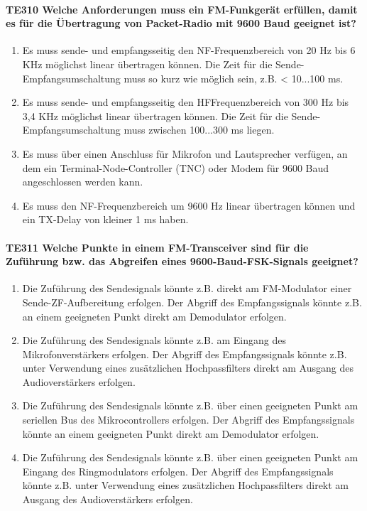 \documentclass[8pt]{article}
\begin{document}
\begin{enumerate}
\begin{enumerate}[nolistsep,label=\Alph*]
\paragraph*{TE310 Welche Anforderungen muss ein FM-Funkgerät erfüllen, damit es für die Übertragung von Packet-Radio mit 9600 Baud geeignet ist?}
\begin{enumerate}[nolistsep,label=\Alph*]
\item Es muss sende- und empfangsseitig den NF-Frequenzbereich von 20 Hz bis 6 KHz möglichst linear übertragen können. Die Zeit für die Sende-Empfangsumschaltung muss so kurz wie möglich sein, z.B. < 10...100 ms.
\item Es muss sende- und empfangsseitig den HFFrequenzbereich von 300 Hz bis 3,4 KHz möglichst linear übertragen können. Die Zeit für die Sende-Empfangsumschaltung muss zwischen 100...300 ms liegen.
\item Es muss über einen Anschluss für Mikrofon und Lautsprecher verfügen, an dem ein Terminal-Node-Controller (TNC) oder Modem für 9600 Baud angeschlossen werden kann.
\item Es muss den NF-Frequenzbereich um 9600 Hz linear übertragen können und ein TX-Delay von kleiner 1 ms haben.
\end{enumerate}

\paragraph*{TE311 Welche Punkte in einem FM-Transceiver sind für die Zuführung bzw. das Abgreifen eines 9600-Baud-FSK-Signals geeignet?} 
\begin{enumerate}[nolistsep,label=\Alph*]
\item Die Zuführung des Sendesignals könnte z.B. direkt am FM-Modulator einer Sende-ZF-Aufbereitung erfolgen. Der Abgriff des Empfangssignals könnte z.B. an einem geeigneten Punkt direkt am Demodulator erfolgen.
\item Die Zuführung des Sendesignals könnte z.B. am Eingang des Mikrofonverstärkers erfolgen. Der Abgriff des Empfangssignals könnte z.B. unter Verwendung eines zusätzlichen Hochpassfilters direkt am Ausgang des Audioverstärkers erfolgen.
\item Die Zuführung des Sendesignals könnte z.B. über einen geeigneten Punkt am seriellen Bus des Mikrocontrollers erfolgen. Der Abgriff des Empfangssignals könnte an einem geeigneten Punkt direkt am Demodulator erfolgen.
\item Die Zuführung des Sendesignals könnte z.B. über einen geeigneten Punkt am Eingang des Ringmodulators erfolgen. Der Abgriff des Empfangssignals könnte z.B. unter Verwendung eines zusätzlichen Hochpassfilters direkt am Ausgang des Audioverstärkers erfolgen.
\end{enumerate}


\end{enumerate}
\end{enumerate}
\end{document}
